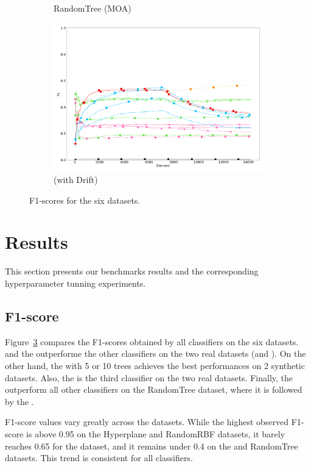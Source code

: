 \begin{figure}
\begin{subfigure}[t]{.49\linewidth}
		\caption{RandomTree (MOA)}
		\label{fig:f1-dataset_3}
	\end{subfigure}
	\hfill
	\begin{subfigure}[t]{.49\linewidth}
		\includegraphics[width=\linewidth]{figures/results/drift_3_f1.png}
		\caption{\banosdataset (with Drift)}
		\label{fig:f1-drift}
	\end{subfigure}
	\caption{F1-scores for the six datasets.}
	\label{fig:f1}
\end{figure}

\section{Results}
This section presents our benchmarks results and the corresponding
hyperparameter tunning experiments.

\subsection{F1-score}
Figure~\ref{fig:f1} compares the F1-scores obtained by all classifiers on the
six datasets.  \naivebayes and the \hoeffdingtree outperforme the other
classifiers on the two real datasets (\banosdataset and \recofitdataset).  On
the other hand, the \mondrianforest with 5 or 10 trees achieves the best
performances on 2 synthetic datasets.  Also, the \mondrianforest is the third
classifier on the two real datasets.  Finally, the \hoeffdingtree outperform
all other classifiers on the RandomTree dataset, where it is followed by the
\mondrianforest.

F1-score values vary greatly across the datasets.  While the highest
observed F1-score is above 0.95 on the Hyperplane and RandomRBF datasets,
it barely reaches 0.65 for the \banosdataset dataset, and it remains under
0.4 on the \recofitdataset and RandomTree datasets. This trend is
consistent for all classifiers.


